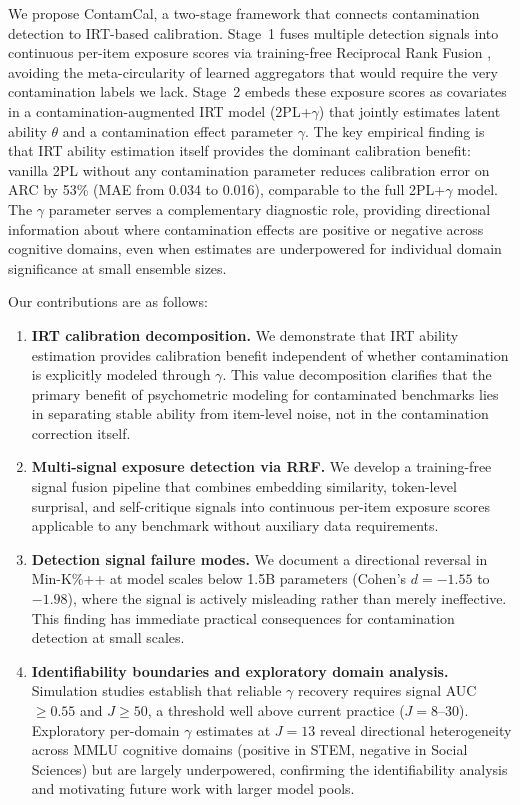We propose ContamCal, a two-stage framework that connects contamination detection to IRT-based calibration. Stage~1 fuses multiple detection signals into continuous per-item exposure scores via training-free Reciprocal Rank Fusion \citep{cormack_2009_rrf}, avoiding the meta-circularity of learned aggregators that would require the very contamination labels we lack. Stage~2 embeds these exposure scores as covariates in a contamination-augmented IRT model (2PL+$\gamma$) that jointly estimates latent ability $\theta$ and a contamination effect parameter $\gamma$. The key empirical finding is that IRT ability estimation itself provides the dominant calibration benefit: vanilla 2PL without any contamination parameter reduces calibration error on ARC by 53\% (MAE from 0.034 to 0.016), comparable to the full 2PL+$\gamma$ model. The $\gamma$ parameter serves a complementary diagnostic role, providing directional information about where contamination effects are positive or negative across cognitive domains, even when estimates are underpowered for individual domain significance at small ensemble sizes.

Our contributions are as follows:
\begin{enumerate}
    \item \textbf{IRT calibration decomposition.} We demonstrate that IRT ability estimation provides calibration benefit independent of whether contamination is explicitly modeled through $\gamma$. This value decomposition clarifies that the primary benefit of psychometric modeling for contaminated benchmarks lies in separating stable ability from item-level noise, not in the contamination correction itself.
    \item \textbf{Multi-signal exposure detection via RRF.} We develop a training-free signal fusion pipeline that combines embedding similarity, token-level surprisal, and self-critique signals into continuous per-item exposure scores applicable to any benchmark without auxiliary data requirements.
    \item \textbf{Detection signal failure modes.} We document a directional reversal in Min-K\%++ at model scales below 1.5B parameters (Cohen's $d = -1.55$ to $-1.98$), where the signal is actively misleading rather than merely ineffective. This finding has immediate practical consequences for contamination detection at small scales.
    \item \textbf{Identifiability boundaries and exploratory domain analysis.} Simulation studies establish that reliable $\gamma$ recovery requires signal AUC $\geq 0.55$ and $J \geq 50$, a threshold well above current practice ($J = 8$--$30$). Exploratory per-domain $\gamma$ estimates at $J = 13$ reveal directional heterogeneity across MMLU cognitive domains (positive in STEM, negative in Social Sciences) but are largely underpowered, confirming the identifiability analysis and motivating future work with larger model pools.
\end{enumerate}